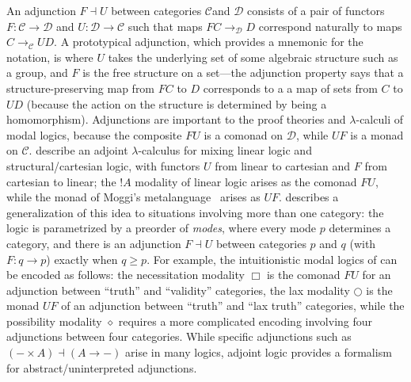 \documentclass{drl-common/llncs}
\newcommand{\C}{\ensuremath{\mathcal{C}}}
\newcommand{\D}{\ensuremath{\mathcal{D}}}
\newcommand{\la}{\ensuremath{\dashv}}
\newcommand{\arrow}[3]{\ensuremath{#2 \longrightarrow_{#1} #3}}
\begin{document}
An adjunction $F \la U$ between categories \C and \D\/ consists of a
pair of functors $F : \C \to \D$ and $U : \D \to \C$ such that maps
\arrow{\D}{F C}{D} correspond naturally to maps \arrow{\C}{C}{U D}.  A
prototypical adjunction, which provides a mnemonic for the notation, is
where $U$ takes the underlying set of some algebraic structure such as a
group, and $F$ is the free structure on a set---the adjunction property
says that a structure-preserving map from $F C$ to $D$ corresponds to a
a map of sets from $C$ to $U D$ (because the action on the structure is
determined by being a homomorphism).  Adjunctions are important to the
proof theories and $\lambda$-calculi of modal logics, because the
composite $FU$ is a comonad on \D, while $UF$ is a monad on $\C$.
\citet{bentonwadler96adjoint} describe an adjoint $\lambda$-calculus for
mixing linear logic and structural/cartesian logic, with functors $U$
from linear to cartesian and $F$ from cartesian to linear; the $! A$
modality of linear logic arises as the comonad $FU$, while the monad of
Moggi's metalanguage~\citep{moggi91monad} arises as $UF$.
\citet{reed09adjoint} describes a generalization of this idea to
situations involving more than one category: the logic is parametrized
by a preorder of \emph{modes}, where every mode $p$ determines a
category, and there is an adjunction $F \la U$ between categories $p$
and $q$ (with $F : q \to p$) exactly when $q \ge p$.  For example, the
intuitionistic modal logics of \citet{pfenningdavies} can be encoded as
follows: the necessitation modality $\Box$ is the comonad $FU$ for an
adjunction between ``truth'' and ``validity'' categories, the lax
modality $\bigcirc$ is the monad $UF$ of an adjunction between ``truth''
and ``lax truth'' categories, while the possibility modality $\diamond$
requires a more complicated encoding involving four adjunctions between
four categories.  While specific adjunctions such as $(- \times A) \la
(A \to -)$ arise in many logics, adjoint logic provides a formalism for
abstract/uninterpreted adjunctions.
\end{document}
